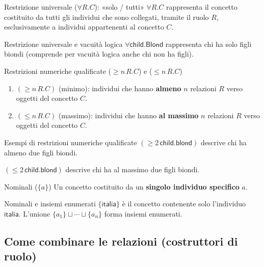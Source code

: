 \begin{definition}{Restrizione universale ($\forall R.C$): «solo / tutti»}
    $\forall R.C$ rappresenta il concetto costituito da tutti gli individui
    che sono collegati, tramite il ruolo $R$, esclusivamente a individui
    appartenenti al concetto $C$.
\end{definition}

\begin{warning}{Restrizione universale e vacuità logica}
    \(\forall\mathsf{child}.\mathsf{Blond}\) rappresenta chi ha solo figli
    biondi (comprende per vacuità logica anche chi non ha figli).
\end{warning}

\begin{definition}{Restrizioni numeriche qualificate (\(\geq n\,R.C\)) e (\(\leq n\,R.C\))}
    \begin{enumerate}
        \item \((\geq n\,R.C)\) (minimo): individui che hanno \textbf{almeno}
            \(n\) relazioni \(R\) verso oggetti del concetto \(C\).
        \item \((\leq n\,R.C)\) (massimo): individui che hanno \textbf{al massimo}
            \(n\) relazioni \(R\) verso oggetti del concetto \(C\).
    \end{enumerate}
\end{definition}
\begin{observation}{Esempi di restrizioni numeriche qualificate}
    \((\geq 2\,\mathsf{child}.\mathsf{blond})\) descrive chi ha almeno due
    figli biondi.

    \((\leq 2\,\mathsf{child}.\mathsf{blond})\) descrive chi ha al massimo
    due figli biondi.
\end{observation}

\begin{definition}{Nominali (\(\{a\}\))}
    Un concetto costituito da un \textbf{singolo individuo specifico} \(a\).
\end{definition}
\begin{observation}{Nominali e insiemi enumerati}
    \(\{\mathsf{italia}\}\) è il concetto contenente solo l'individuo
    \(\mathsf{italia}\). L'unione \(\{a_1\}\sqcup\cdots\sqcup\{a_n\}\)
    forma insiemi enumerati.
\end{observation}

\newpage

\subsection{Come combinare le relazioni (costruttori di ruolo)}

